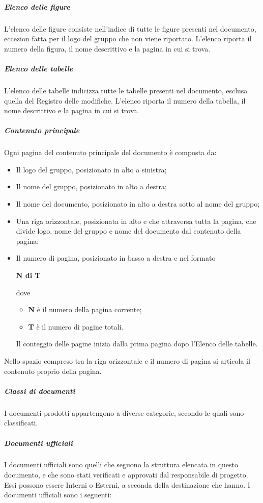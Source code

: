 \documentclass[../norme-di-progetto.tex]{subfiles}
\begin{document}
\subparagraph*{Elenco delle figure}
L'elenco delle figure consiste nell'indice di tutte le figure presenti nel documento, eccezion fatta per il logo del gruppo che non viene riportato. L'elenco riporta il numero della figura, il nome descrittivo e la pagina in cui si trova.

\subparagraph*{Elenco delle tabelle}
L'elenco delle tabelle indicizza tutte le tabelle presenti nel documento, esclusa quella del Registro delle modifiche. L'elenco riporta il numero della tabella, il nome  descrittivo e la pagina in cui si trova.

\subparagraph*{Contenuto principale}
Ogni pagina del contenuto principale del documento è composta da:
\begin{itemize}
  \item Il logo del gruppo, posizionato in alto a sinistra;
  \item Il nome del gruppo, posizionato in alto a destra;
  \item Il nome del documento, posizionato in alto a destra sotto al nome del gruppo;
  \item Una riga orizzontale, posizionata in alto e che attraversa tutta la pagina, che divide logo, nome del gruppo e nome del documento dal contenuto della pagina;
  \item Il numero di pagina, posizionato in basso a destra e nel formato \\ \begin{center}
    \centering
    \textbf{N di T}
  \end{center} dove
\begin{itemize}
  \item \textbf{N} è il numero della pagina corrente;
  \item \textbf{T} è il numero di pagine totali.
\end{itemize}
Il conteggio delle pagine inizia dalla prima pagina dopo l'Elenco delle tabelle.
\end{itemize}
Nello spazio compreso tra la riga orizzontale e il numero di pagina si articola il contenuto proprio della pagina.

\subparagraph{Classi di documenti}
I documenti prodotti appartengono a diverse categorie, secondo le quali sono classificati.

\subparagraph*{Documenti ufficiali}
I documenti ufficiali sono quelli che seguono la struttura elencata in questo documento, e che sono stati verificati e approvati dal responsabile di progetto. Essi possono essere Interni o Esterni, a seconda della destinazione che hanno. I documenti ufficiali sono i seguenti:
\end{document}
